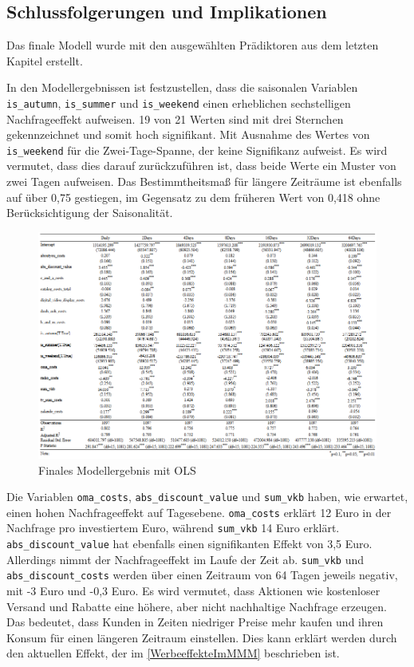 \subsection{Schlussfolgerungen und Implikationen}
\label{schlussfolgerungenUndImplikationen}
Das finale Modell wurde mit den ausgewählten Prädiktoren aus dem letzten Kapitel erstellt. \par
In den Modellergebnissen ist festzustellen, dass die saisonalen Variablen \verb|is_autumn|, \verb|is_summer| und \verb|is_weekend| einen erheblichen sechstelligen Nachfrageeffekt aufweisen. 19 von 21 Werten sind mit drei Sternchen gekennzeichnet und somit hoch signifikant. Mit Ausnahme des Wertes von \verb|is_weekend| für die Zwei-Tage-Spanne, der keine Signifikanz aufweist. Es wird vermutet, dass dies darauf zurückzuführen ist, dass beide Werte ein Muster von zwei Tagen aufweisen. Das Bestimmtheitsmaß für längere Zeiträume ist ebenfalls auf über 0,75 gestiegen, im Gegensatz zu dem früheren Wert von 0,418 ohne Berücksichtigung der Saisonalität.
\begin{figure}[H]
    \centering
    \includegraphics[width=1\linewidth]{images/finalols.png}
    \caption{Finales Modellergebnis mit \ac{OLS}}
    \label{fig:finalmodell}
\end{figure}
\noindent
Die Variablen \verb|oma_costs|, \verb|abs_discount_value| und \verb|sum_vkb| haben, wie erwartet, einen hohen Nachfrageeffekt auf Tagesebene. \verb|oma_costs| erklärt 12 Euro in der Nachfrage pro investiertem Euro, während \verb|sum_vkb| 14 Euro erklärt. \verb|abs_discount_value| hat ebenfalls einen signifikanten Effekt von 3,5 Euro. Allerdings nimmt der Nachfrageeffekt im Laufe der Zeit ab. \verb|sum_vkb| und \verb|abs_discount_costs| werden über einen Zeitraum von 64 Tagen jeweils negativ, mit -3 Euro und -0,3 Euro. Es wird vermutet, dass Aktionen wie kostenloser Versand und Rabatte eine höhere, aber nicht nachhaltige Nachfrage erzeugen. Das bedeutet, dass Kunden in Zeiten niedriger Preise mehr kaufen und ihren Konsum für einen längeren Zeitraum einstellen. Dies kann erklärt werden durch den aktuellen Effekt, der im \autoref{WerbeeffekteImMMM} beschrieben ist. \par 

